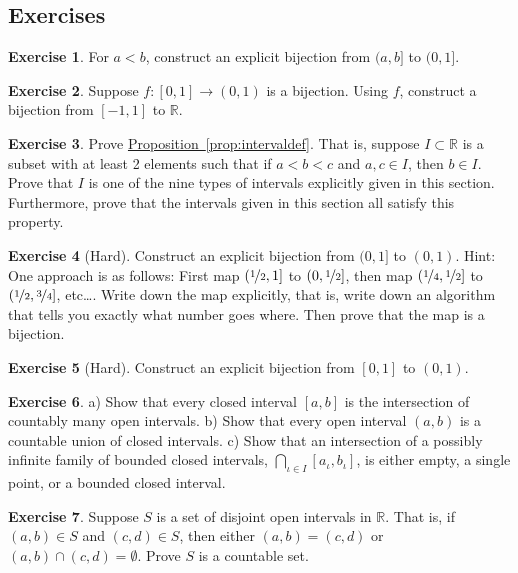 \documentclass[12pt]{book}
\newcommand{\R}{{\mathbb{R}}}
\theoremstyle{plain}
\theoremstyle{remark}
\theoremstyle{definition}
\theoremstyle{exercise}
\newtheorem{exercise}{Exercise}[section]
\theoremstyle{example}
\newcommand{\propref}[1]{\hyperref[#1]{Proposition~\ref*{#1}}}
\begin{document}
\subsection{Exercises}

\begin{exercise}
For $a < b$, construct an explicit bijection from $(a,b]$ to $(0,1]$.
\end{exercise}

\begin{exercise}
Suppose $f \colon [0,1] \to (0,1)$ is a bijection.
Using $f$, construct a
bijection from $[-1,1]$ to $\R$.
\end{exercise}

\begin{exercise} \label{exercise:intervaldef}
Prove \propref{prop:intervaldef}.
That is,
suppose $I \subset \R$ is a subset with at least 2 elements
such that if $a < b < c$ and $a, c \in I$, then $b \in I$.
Prove that $I$ is one of the nine types of intervals explicitly
given in this section.
Furthermore, prove that the intervals given in this section
all satisfy this property.
\end{exercise}

\begin{exercise}[Hard]
Construct an explicit bijection from $(0,1]$ to $(0,1)$.
Hint: One approach is as follows: First map $(\nicefrac{1}{2},1]$
to $(0,\nicefrac{1}{2}]$, then map
$(\nicefrac{1}{4},\nicefrac{1}{2}]$
to $(\nicefrac{1}{2},\nicefrac{3}{4}]$, etc\ldots.
Write down the map explicitly, that
is, write down an algorithm that tells you exactly what number goes where.
Then prove that the map is a bijection.
\end{exercise}

\begin{exercise}[Hard]
Construct an explicit bijection from $[0,1]$ to $(0,1)$.
\end{exercise}

\begin{exercise}
a) Show that every closed interval $[a,b]$ is the intersection
of countably many open intervals.  b) Show that every open interval $(a,b)$
is a countable union of closed intervals.  c) Show that an intersection
of a possibly infinite family of bounded closed intervals,
$\bigcap\limits_{\iota \in I} [a_\iota,b_\iota]$,
is either empty, a single point,
or a bounded closed interval.
\end{exercise}

\begin{exercise}
Suppose $S$ is a set of disjoint open intervals in $\R$.  That is, 
if $(a,b) \in S$ and $(c,d) \in S$, then either $(a,b) = (c,d)$
or $(a,b) \cap (c,d) = \emptyset$.  Prove $S$ is a countable set.
\end{exercise}
\end{document}
